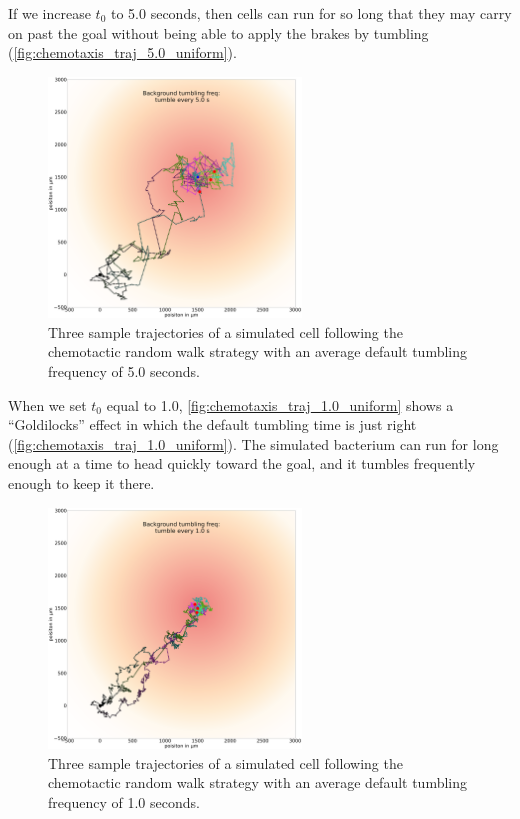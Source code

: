 If we increase $t_0$ to 5.0 seconds, then cells can run for so long that they may carry on past the goal without being able to apply the brakes by tumbling (\autoref{fig:chemotaxis_traj_5.0_uniform}).

\begin{figure}[h]
\centering
\mySfFamily
\includegraphics[width = 0.6\textwidth]{../images/chemotaxis_traj_5.0_uniform.png}
\caption{Three sample trajectories of a simulated cell following the chemotactic random walk strategy with an average default tumbling frequency of 5.0 seconds.}
\label{fig:chemotaxis_traj_5.0_uniform}
\end{figure}


When we set $t_0$ equal to 1.0, \autoref{fig:chemotaxis_traj_1.0_uniform} shows a ``Goldilocks'' effect in which the default tumbling time is just right (\autoref{fig:chemotaxis_traj_1.0_uniform}). The simulated bacterium can run for long enough at a time to head quickly toward the goal, and it tumbles frequently enough to keep it there.

\begin{figure}[h]
\centering
\mySfFamily
\includegraphics[width = 0.6\textwidth]{../images/chemotaxis_traj_1.0_uniform.png}
\caption{Three sample trajectories of a simulated cell following the chemotactic random walk strategy with an average default tumbling frequency of 1.0 seconds.}
\label{fig:chemotaxis_traj_1.0_uniform}
\end{figure}


